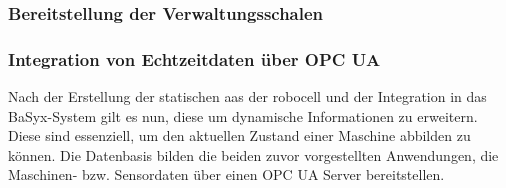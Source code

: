 \subsubsection{Bereitstellung der Verwaltungsschalen}




\newpage
\subsubsection{Integration von Echtzeitdaten über OPC UA}
Nach der Erstellung der statischen \acs{aas} der robocell und der Integration in das BaSyx-System gilt es nun, diese um dynamische Informationen zu erweitern.
Diese sind essenziell, um den aktuellen Zustand einer Maschine abbilden zu können.
Die Datenbasis bilden die beiden zuvor vorgestellten Anwendungen, die Maschinen- bzw. Sensordaten über einen OPC UA Server bereitstellen.




